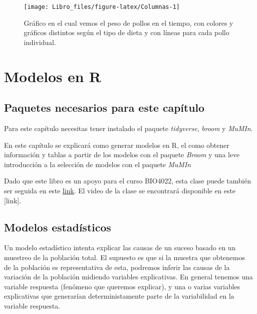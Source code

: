 \documentclass[]{book}
\begin{document}
\begin{figure}

{\centering \texttt{[image: Libro\_files/figure-latex/Columnas-1]} 

}

\caption{Gráfico en el cual vemos el peso de pollos en el tiempo, con colores y gráficos distintos según el tipo de dieta y con líneas para cada pollo individual.}\label{fig:Columnas}
\end{figure}

\hypertarget{modelos}{%
\chapter{Modelos en R}\label{modelos}}

\hypertarget{paquetes-necesarios-para-este-capitulo-4}{%
\section{Paquetes necesarios para este
capítulo}\label{paquetes-necesarios-para-este-capitulo-4}}

Para este capítulo necesitas tener instalado el paquete
\emph{tidyverse}, \emph{broom} y \emph{MuMIn}.

En este capítulo se explicará como generar modelos en R, el como obtener
información y tablas a partir de los modelos con el paquete \emph{Broom}
\citep{Robinson2018} y una leve introducción a la selección de modelos
con el paquete \emph{MuMIn} \citep{Barton2018}

Dado que este libro es un apoyo para el curso BIO4022, esta clase puede
también ser seguida en este
\href{https://derek-corcoran-barrios.github.io/Clase5/Modelos}{link}. El
video de la clase se encontrará disponible en este {[}link{]}.

\hypertarget{modelos-estadisticos}{%
\section{Modelos estadísticos}\label{modelos-estadisticos}}

Un modelo estadístico intenta explicar las causas de un suceso basado en
un muestreo de la población total. El supuesto es que si la muestra que
obtenemos de la población es representativa de esta, podremos inferir
las causas de la variación de la población midiendo variables
explicativas. En general tenemos una variable respuesta (fenómeno que
queremos explicar), y una o varias variables explicativas que generarían
deterministamente parte de la variabilidad en la variable respuesta.
\end{document}
